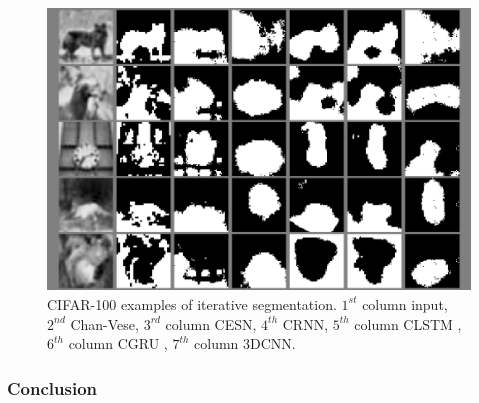 \documentclass{WitsPhysicsReport}
\begin{document}

\begin{figure}[H]
\centering
  \includegraphics[width=1\linewidth]{Figure/Results/CIFAR_100_sample.png}
 \caption{CIFAR-100 examples of iterative segmentation. $1^{st}$ column input, $2^{nd}$ Chan-Vese, $3^{rd}$ column CESN, $4^{th}$ CRNN, $5^{th}$ column CLSTM , $6^{th}$ column CGRU , $7^{th}$ column 3DCNN.}
 \label{fig:sample_results_cifar100}
\end{figure}



\subsubsection{Conclusion}
 
\end{document}
